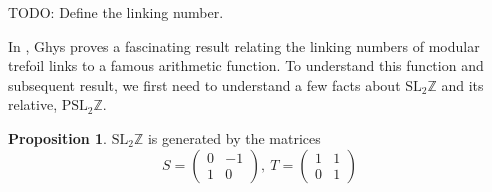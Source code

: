 \documentclass[12pt,twoside]{reedthesis}
\theoremstyle{definition}
\newtheorem{prop}[thm]{Proposition}
\newcommand{\Z}{\mathbb{Z}}
\newcommand{\SLZ}{\mathrm{SL}_2{\Z}}
\newcommand{\PSLZ}{\mathrm{PSL}_2{\Z}}
\newcommand{\TODO}[1]{{\color{todopink}\textsf{TODO: #1}}}
\begin{document}
\TODO{Define the linking number.}

In \cite{ghys2007}, Ghys proves a fascinating result relating the linking numbers of modular trefoil links to a famous arithmetic function.
To understand this function and subsequent result, we first need to understand a few facts about $\SLZ$ and its relative, $\PSLZ$.

\begin{prop}
  $\SLZ$ is generated by the matrices
  \begin{equation*}
    S = \begin{pmatrix}
      0 & -1 \\
      1 & 0
    \end{pmatrix},\
    T = \begin{pmatrix}
      1 & 1 \\
      0 & 1
    \end{pmatrix}
  \end{equation*}
\end{prop}
\end{document}
